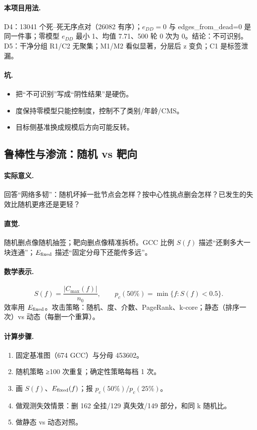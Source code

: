 \paragraph{本项目用法.}
\unit{D4}：13041 个死--死无序点对（26082 有序）；\(e_{DD}=0\) 与 edges\_from\_dead=0 是同一件事；零模型 \(e_{DD}\) 最小 1、均值 7.71、500 轮 0 次为 0。结论：不可识别。\unit{D5}：干净分组 R1/C2 无聚集；M1/M2 看似显著，分层后 z 变负；C1 是标签泄漏。

\paragraph{坑.}
\begin{itemize}
  \item 把“不可识别”写成“阴性结果”是硬伤。
  \item 度保持零模型只能控制度，控制不了类别/年龄/CMS。
  \item 目标侧基准换成规模后方向可能反转。
\end{itemize}

\subsection{鲁棒性与渗流：随机 vs 靶向}

\paragraph{实际意义.}
回答“网络多韧”：随机坏掉一批节点会怎样？按中心性挑点删会怎样？已发生的失效比随机更疼还是更轻？

\paragraph{直觉.}
随机删点像随机抽签；靶向删点像精准拆桥。GCC 比例 \(S(f)\) 描述“还剩多大一块连通”；\(E_{\mathrm{fixed}}\) 描述“固定分母下还能传多远”。

\paragraph{数学表示.}
\[
S(f)=\frac{|C_{\max}(f)|}{n_0},\qquad
p_c(50\%)=\min\{f:S(f)<0.5\}.
\]
效率用 \(E_{\mathrm{fixed}}\)。攻击策略：随机、度、介数、PageRank、k-core；静态（排序一次）vs 动态（每删一个重算）。

\paragraph{计算步骤.}
\begin{enumerate}
  \item 固定基准图（674 GCC）与分母 453602。
  \item 随机策略 ≥100 次重复；确定性策略每档 1 次。
  \item 画 \(S(f)\)、\(E_{\mathrm{fixed}}(f)\)；报 \(p_c(50\%)/p_c(25\%)\)。
  \item 做观测失效情景：删 162 全挂/129 真失效/149 部分，和同 k 随机比。
  \item 做静态 vs 动态对照。
\end{enumerate}

